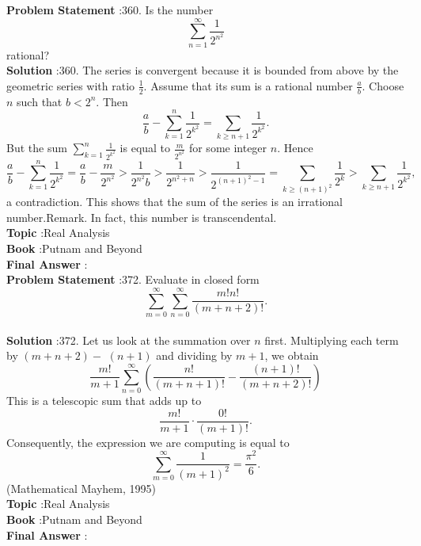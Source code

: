\documentclass[10pt]{article}
\begin{document}
\textbf{Problem Statement} :360. Is the number$$ \sum_{n=1}^{\infty} \frac{1}{2^{n^{2}}} $$rational?\\
\textbf{Solution} :360. The series is convergent because it is bounded from above by the geometric series with ratio $\frac{1}{2}$. Assume that its sum is a rational number $\frac{a}{b}$. Choose $n$ such that $b<2^{n}$. Then$$ \frac{a}{b}-\sum_{k=1}^{n} \frac{1}{2^{k^{2}}}=\sum_{k \geq n+1} \frac{1}{2^{k^{2}}} . $$But the sum $\sum_{k=1}^{n} \frac{1}{2^{k^{2}}}$ is equal to $\frac{m}{2^{n^{2}}}$ for some integer $n$. Hence$$ \frac{a}{b}-\sum_{k=1}^{n} \frac{1}{2^{k^{2}}}=\frac{a}{b}-\frac{m}{2^{n^{2}}}>\frac{1}{2^{n^{2}} b}>\frac{1}{2^{n^{2}+n}}>\frac{1}{2^{(n+1)^{2}-1}}=\sum_{k \geq(n+1)^{2}} \frac{1}{2^{k}}>\sum_{k \geq n+1} \frac{1}{2^{k^{2}}}, $$a contradiction. This shows that the sum of the series is an irrational number.Remark. In fact, this number is transcendental.\\
\textbf{Topic} :Real Analysis\\
\textbf{Book} :Putnam and Beyond\\
\textbf{Final Answer} :\\


\textbf{Problem Statement} :372. Evaluate in closed form$$ \sum_{m=0}^{\infty} \sum_{n=0}^{\infty} \frac{m ! n !}{(m+n+2) !} . $$\\
\textbf{Solution} :372. Let us look at the summation over $n$ first. Multiplying each term by $(m+n+2)-$ $(n+1)$ and dividing by $m+1$, we obtain$$ \frac{m !}{m+1} \sum_{n=0}^{\infty}\left(\frac{n !}{(m+n+1) !}-\frac{(n+1) !}{(m+n+2) !}\right) $$This is a telescopic sum that adds up to$$ \frac{m !}{m+1} \cdot \frac{0 !}{(m+1) !} . $$Consequently, the expression we are computing is equal to$$ \sum_{m=0}^{\infty} \frac{1}{(m+1)^{2}}=\frac{\pi^{2}}{6} . $$(Mathematical Mayhem, 1995)\\
\textbf{Topic} :Real Analysis\\
\textbf{Book} :Putnam and Beyond\\
\textbf{Final Answer} :\\
\end{document}
